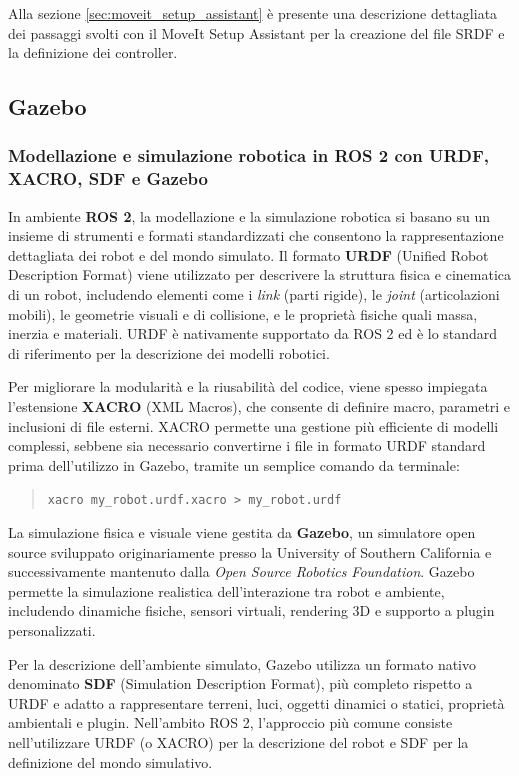 \documentclass[11pt]{report}
\begin{document}
Alla sezione \ref{sec:moveit_setup_assistant} è presente una descrizione dettagliata dei passaggi svolti con il MoveIt Setup Assistant per la creazione del file SRDF e la definizione dei controller.
\subsection{Gazebo}

\subsubsection*{Modellazione e simulazione robotica in ROS 2 con URDF, XACRO, SDF e Gazebo}

In ambiente \textbf{ROS 2}, la modellazione e la simulazione robotica si basano su un insieme di strumenti e formati standardizzati che consentono la rappresentazione dettagliata dei robot e del mondo simulato. Il formato \textbf{URDF} (Unified Robot Description Format) viene utilizzato per descrivere la struttura fisica e cinematica di un robot, includendo elementi come i \textit{link} (parti rigide), le \textit{joint} (articolazioni mobili), le geometrie visuali e di collisione, e le proprietà fisiche quali massa, inerzia e materiali. URDF è nativamente supportato da ROS 2 ed è lo standard di riferimento per la descrizione dei modelli robotici.

Per migliorare la modularità e la riusabilità del codice, viene spesso impiegata l’estensione \textbf{XACRO} (XML Macros), che consente di definire macro, parametri e inclusioni di file esterni. XACRO permette una gestione più efficiente di modelli complessi, sebbene sia necessario convertirne i file in formato URDF standard prima dell’utilizzo in Gazebo, tramite un semplice comando da terminale:

\begin{quote}
\texttt{xacro my\_robot.urdf.xacro > my\_robot.urdf}
\end{quote}

La simulazione fisica e visuale viene gestita da \textbf{Gazebo}, un simulatore open source sviluppato originariamente presso la University of Southern California e successivamente mantenuto dalla \textit{Open Source Robotics Foundation}. Gazebo permette la simulazione realistica dell’interazione tra robot e ambiente, includendo dinamiche fisiche, sensori virtuali, rendering 3D e supporto a plugin personalizzati.

Per la descrizione dell’ambiente simulato, Gazebo utilizza un formato nativo denominato \textbf{SDF} (Simulation Description Format), più completo rispetto a URDF e adatto a rappresentare terreni, luci, oggetti dinamici o statici, proprietà ambientali e plugin. Nell’ambito ROS 2, l’approccio più comune consiste nell’utilizzare URDF (o XACRO) per la descrizione del robot e SDF per la definizione del mondo simulativo.
\end{document}
